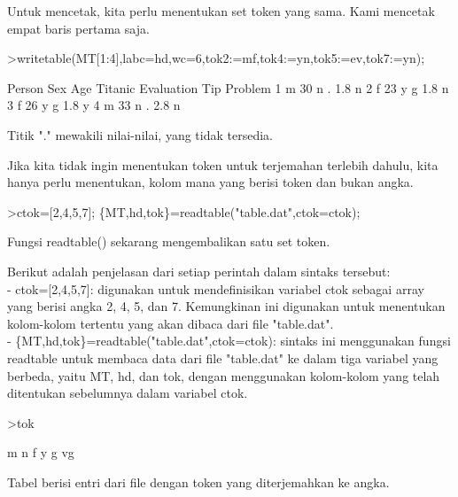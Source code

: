 \documentclass[a4paper,10pt]{article}
\begin{document}
\begin{eulernotebook}
\begin{eulercomment}
\begin{eulercomment}
\begin{eulercomment}
\begin{eulercomment}
\begin{eulercomment}
\begin{eulercomment}
\begin{eulercomment}
\begin{eulercomment}
\begin{eulercomment}
\begin{eulercomment}
\begin{eulercomment}
\begin{eulercomment}
\begin{eulercomment}
\begin{eulercomment}
\begin{eulercomment}
\begin{eulercomment}
\begin{eulercomment}
Untuk mencetak, kita perlu menentukan set token yang sama. Kami
mencetak empat baris pertama saja.
\end{eulercomment}
\begin{eulerprompt}
>writetable(MT[1:4],labc=hd,wc=6,tok2:=mf,tok4:=yn,tok5:=ev,tok7:=yn);
\end{eulerprompt}
\begin{euleroutput}
   Person   Sex   Age Titanic Evaluation   Tip Problem
        1     m    30       n          .   1.8       n
        2     f    23       y          g   1.8       n
        3     f    26       y          g   1.8       y
        4     m    33       n          .   2.8       n
\end{euleroutput}
\begin{eulercomment}
Titik "." mewakili nilai-nilai, yang tidak tersedia.

Jika kita tidak ingin menentukan token untuk terjemahan terlebih
dahulu, kita hanya perlu menentukan, kolom mana yang berisi token dan
bukan angka.
\end{eulercomment}
\begin{eulerprompt}
>ctok=[2,4,5,7]; \{MT,hd,tok\}=readtable("table.dat",ctok=ctok);
\end{eulerprompt}
\begin{eulercomment}
Fungsi readtable() sekarang mengembalikan satu set token.

Berikut adalah penjelasan dari setiap perintah dalam sintaks tersebut:\\
- ctok=[2,4,5,7]: digunakan untuk mendefinisikan variabel ctok sebagai
array yang berisi angka 2, 4, 5, dan 7. Kemungkinan ini digunakan
untuk menentukan kolom-kolom tertentu yang akan dibaca dari file
"table.dat".\\
- \{MT,hd,tok\}=readtable("table.dat",ctok=ctok): sintaks ini
menggunakan fungsi readtable untuk membaca data dari file "table.dat"
ke dalam tiga variabel yang berbeda, yaitu MT, hd, dan tok, dengan
menggunakan kolom-kolom yang telah ditentukan sebelumnya dalam
variabel ctok.
\end{eulercomment}
\begin{eulerprompt}
>tok
\end{eulerprompt}
\begin{euleroutput}
  m
  n
  f
  y
  g
  vg
\end{euleroutput}
\begin{eulercomment}
Tabel berisi entri dari file dengan token yang diterjemahkan ke angka.


\end{eulercomment}
\end{eulercomment}
\end{eulercomment}
\end{eulercomment}
\end{eulercomment}
\end{eulercomment}
\end{eulercomment}
\end{eulercomment}
\end{eulercomment}
\end{eulercomment}
\end{eulercomment}
\end{eulercomment}
\end{eulercomment}
\end{eulercomment}
\end{eulercomment}
\end{eulercomment}
\end{eulercomment}
\end{eulernotebook}
\end{document}
